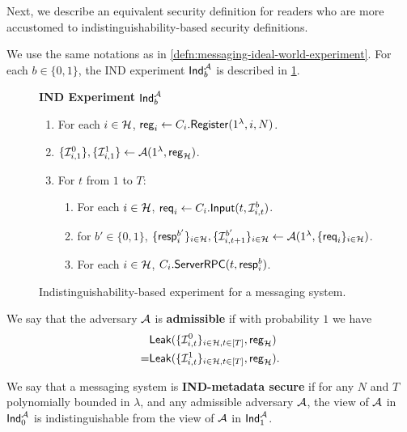 Next, we describe an equivalent security definition for readers who are more accustomed to indistinguishability-based security definitions.
\begin{definition}
\label{defn:messaging-ind-experiment}
We use the same notations as in \cref{defn:messaging-ideal-world-experiment}. For each $b \in \{0, 1\}$, the IND experiment $\mathsf{Ind}_b^{\mathcal{A}}$ is described in \cref{expr:messaging-IND}.

\begin{figure}[ht]
\begin{framed}
\textbf{IND Experiment} $\mathsf{Ind}_b^{\mathcal{A}}$
\begin{enumerate}
\item For each $i \in \mathcal{H}$, $\mathsf{reg}_i \leftarrow C_i.\mathsf{Register}(1^{\lambda}, i, N)$. 
\item $\{\mathcal{I}^{0}_{i, 1}\}, \{\mathcal{I}^{1}_{i, 1}\} \leftarrow \mathcal{A}(1^{\lambda}, \mathsf{reg}_{\mathcal{H}})$.
\item For $t$ from $1$ to $T$:
    \begin{enumerate}
    \item For each $i \in \mathcal{H}$, $\mathsf{req}_i \leftarrow C_i.\mathsf{Input}(t, \mathcal{I}^{b}_{i, t})$.
    
    \item for $b'\in \{0, 1\}$, $\{\mathsf{resp}^{b'}_i\}_{i \in \mathcal{H}},\{\mathcal{I}^{b'}_{i, t + 1}\}_{i \in \mathcal{H}} \leftarrow \mathcal{A}(1^{\lambda}, \{\mathsf{req}_i\}_{i \in \mathcal{H}})$.
    
    \item For each $i \in \mathcal{H}$, $C_i.\mathsf{ServerRPC}(t, \mathsf{resp}^{b}_i)$.
    \end{enumerate}
\end{enumerate}
\end{framed}
\caption{Indistinguishability-based experiment for a messaging system.}
\label{expr:messaging-IND}
\end{figure}

We say that the adversary $\mathcal{A}$ is \textbf{admissible} if with probability $1$ we have
\begin{align*}
&\mathsf{Leak}(\{\mathcal{I}^{0}_{i, t}\}_{i \in \mathcal{H}, t \in [T]}, \mathsf{reg}_{\mathcal{H}}) \\
= &\mathsf{Leak}(\{\mathcal{I}^{1}_{i, t}\}_{i \in \mathcal{H}, t \in [T]}, \mathsf{reg}_{\mathcal{H}}).    
\end{align*}
\end{definition}
\begin{definition}
\label{defn:messaging-IND-security}
We say that a messaging system is \textbf{IND-metadata secure} if for any $N$ and $T$ polynomially bounded in $\lambda$, and any admissible adversary $\mathcal{A}$, the view of $\mathcal{A}$ in $\mathsf{Ind}_0^{\mathcal{A}}$ is indistinguishable from the view of $\mathcal{A}$ in $\mathsf{Ind}_1^{\mathcal{A}}$.
\end{definition}

